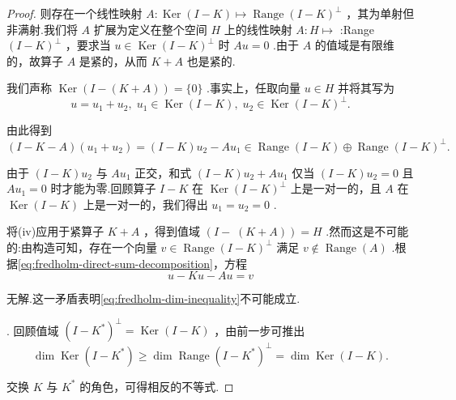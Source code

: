 \begin{proof}
则存在一个线性映射 $A : \operatorname{Ker}\left( {I - K}\right)  \mapsto  \operatorname{Range}{\left( I - K\right) }^{ \bot  }$ ，其为单射但非满射.我们将 $A$ 扩展为定义在整个空间 $H$ 上的线性映射 $A : H \mapsto$ :Range ${\left( I - K\right) }^{ \bot  }$ ，要求当 $u \in  \operatorname{Ker}{\left( I - K\right) }^{ \bot  }$ 时 ${Au} = 0$ .由于 $A$ 的值域是有限维的，故算子 $A$ 是紧的，从而 $K + A$ 也是紧的.

我们声称 $\operatorname{Ker}\left( {I - \left( {K + A}\right) }\right)  = \{ 0\}$ .事实上，任取向量 $u \in  H$ 并将其写为
\[
u = {u}_{1} + {u}_{2},\;{u}_{1} \in  \operatorname{Ker}\left( {I - K}\right) ,\;{u}_{2} \in  \operatorname{Ker}{\left( I - K\right) }^{ \bot  }.
\]

由此得到
\begin{equation}\tag{6.4}\label{eq:fredholm-direct-sum-decomposition}
\left( {I - K - A}\right) \left( {{u}_{1} + {u}_{2}}\right) 
= \left( {I - K}\right) {u}_{2} - A{u}_{1}
\in  \operatorname{Range}\left( {I - K}\right)  \oplus  \operatorname{Range}{\left( I - K\right) }^{ \bot  }.
\end{equation}

由于 $\left( {I - K}\right) {u}_{2}$ 与 $A{u}_{1}$ 正交，和式 $\left( {I - K}\right) {u}_{2} + A{u}_{1}$ 仅当 $\left( {I - K}\right) {u}_{2} = 0$ 且 $A{u}_{1} = 0$ 时才能为零.回顾算子 $I - K$ 在 $\operatorname{Ker}{\left( I - K\right) }^{ \bot  }$ 上是一对一的，且 $A$ 在 $\operatorname{Ker}\left( {I - K}\right)$ 上是一对一的，我们得出 ${u}_{1} = {u}_{2} = 0$ .

将(iv)应用于紧算子 $K + A$ ，得到值域 $(I - \; \left( {K + A}\right) ) = H$ .然而这是不可能的:由构造可知，存在一个向量 $v \in  \operatorname{Range}{\left( I - K\right) }^{ \bot  }$ 满足 $v \notin  \operatorname{Range}\left( A\right)$ .根据\eqref{eq:fredholm-direct-sum-decomposition}，方程
\[
u - {Ku} - {Au} = v
\]

无解.这一矛盾表明\eqref{eq:fredholm-dim-inequality}不可能成立.

. 回顾值域 ${\left( I - {K}^{ * }\right) }^{ \bot  } = \operatorname{Ker}\left( {I - K}\right)$ ，由前一步可推出
\[
\dim \operatorname{Ker}\left( {I - {K}^{ * }}\right)  \geq  \dim \operatorname{Range}{\left( I - {K}^{ * }\right) }^{ \bot  } = \dim \operatorname{Ker}\left( {I - K}\right) .
\]

交换 $K$ 与 ${K}^{ * }$ 的角色，可得相反的不等式.
\end{proof}

